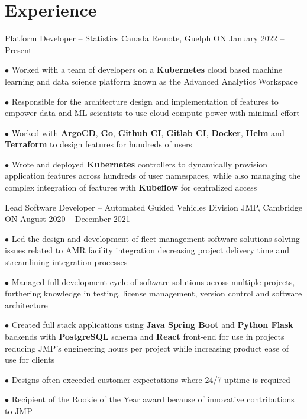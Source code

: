 \documentclass[a4paper,11pt]{article}
\newcommand{\sectionsep}{\vspace{-2.5mm}}
\begin{document}
\sectionsep
\section{Experience}
\resumeSubHeadingListStart

\resumeExp
{Platform Developer -- Statistics Canada}
{Remote, Guelph ON}
{January 2022 -- Present}
{}
\resumeItemListStart
\item[$\bullet$] Worked with a team of developers on a \textbf{Kubernetes} cloud based machine learning and data science
platform known as the Advanced Analytics Workspace
\href{https://analytics-platform.statcan.gc.ca/covid19}{\footnotesize{\faExternalLink}}
\item[$\bullet$] Responsible for the architecture design and implementation of features to  empower data and ML scientists to
use cloud compute power with  minimal effort
\item[$\bullet$] Worked with \textbf{ArgoCD}, \textbf{Go}, \textbf{Github CI}, \textbf{Gitlab CI}, \textbf{Docker}, \textbf{Helm} and
\textbf{Terraform} to design features for hundreds of users
\item[$\bullet$] Wrote and deployed \textbf{Kubernetes} controllers to dynamically provision application
features across hundreds of user namespaces, while
also managing the complex integration of features with \textbf{Kubeflow} for centralized access
\resumeItemListEnd

\resumeExp
{Lead Software Developer -- Automated Guided Vehicles Division}
{JMP, Cambridge ON}
{August 2020 -- December 2021}
{}
\resumeItemListStart
\item[$\bullet$] Led the design and development of fleet management software solutions solving issues related to
AMR facility integration decreasing project delivery time and streamlining integration processes
\item[$\bullet$]  Managed full development cycle of software solutions across multiple projects, furthering
knowledge in testing, license management, version control and software architecture
\item[$\bullet$] Created full stack applications using \textbf{Java Spring Boot} and \textbf{Python Flask} backends with
\textbf{PostgreSQL} schema and \textbf{React} front-end for use in projects reducing JMP's engineering hours
per project while increasing product ease of use for clients
\item[$\bullet$] Designs often exceeded customer expectations where 24/7 uptime is required
\item[$\bullet$] Recipient of the Rookie of the Year award because of innovative contributions to JMP
\resumeItemListEnd
\end{document}
